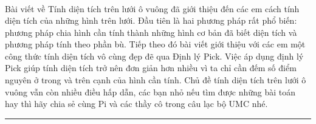 \begin{multicols}{2}
\begin{align*}
	\end{align*}
	Bài viết về Tính diện tích trên lưới ô vuông đã giới thiệu đến các em cách tính diện tích của những hình trên lưới. Đầu tiên là hai phương pháp rất phổ biến: phương pháp chia hình cần tính thành những hình cơ bản đã biết diện tích và phương pháp tính theo phần bù. Tiếp theo đó bài viết giới thiệu với các em một công thức tính diện tích vô cùng đẹp đẽ qua Định lý Pick. Việc áp dụng định lý Pick giúp tính diện tích trở nên đơn giản hơn nhiều vì ta chỉ cần đếm số điểm nguyên ở trong và trên cạnh của hình cần tính. Chủ đề tính diện tích trên lưới ô vuông vẫn còn nhiều điều hấp dẫn, các bạn nhỏ nếu tìm được những bài toán hay thì hãy chia sẻ cùng Pi và các thầy cô trong câu lạc bộ UMC nhé.
\end{multicols}
\vspace*{-10pt}
{\color{toancuabi}\rule{1\linewidth}{0.1pt}}
\begingroup
{}
